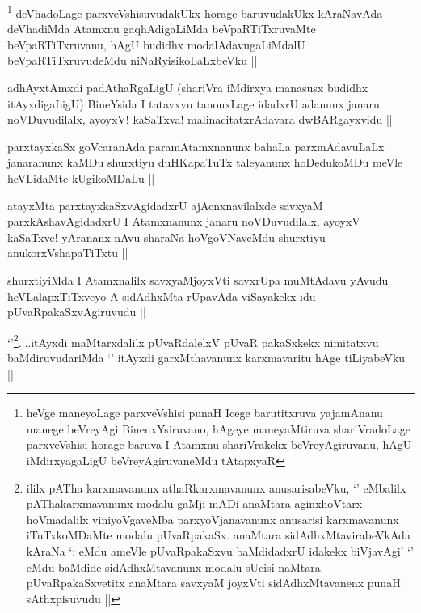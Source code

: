 
\begin{artha}
\footnote[1]{heVge maneyoLage parxveVshisi punaH Icege barutitxruva yajamAnanu manege beVreyAgi BinenxYsiruvano, hAgeye maneyaMtiruva shariVradoLage parxveVshisi horage baruva I Atamxnu shariVrakekx beVreyAgiruvanu, hAgU iMdirxyagaLigU beVreyAgiruvaneMdu tAtapxyaR}
deVhadoLage parxveVshisuvudakUkx horage baruvudakUkx  kAraNavAda deVhadiMda Atamxnu gaqhAdigaLiMda beVpaRTiTxruvaMte beVpaRTiTxruvanu, hAgU budidhx modalAdavugaLiMdalU beVpaRTiTxruvudeMdu niNaRyisikoLaLxbeVku ||
\end{artha}


\begin{artha}
adhAyxtAmxdi padAthaRgaLigU (shariVra iMdirxya manasusx budidhx itAyxdigaLigU) BineYsida I tatavxvu tanonxLage idadxrU adanunx janaru noVDuvudilalx, ayoyxV! kaSaTxva! malinacitatxrAdavara dwBARgayxvidu ||
\end{artha}

\begin{artha}
parxtayxkaSx goVcaranAda paramAtamxnanunx bahaLa parxmAdavuLaLx janaranunx kaMDu shurxtiyu duHKapaTuTx taleyanunx hoDedukoMDu meVle heVLidaMte kUgikoMDaLu ||
\end{artha}


\begin{artha}
atayxMta parxtayxkaSxvAgidadxrU ajAcnxnavilalxde savxyaM parxkAshavAgidadxrU I Atamxnanunx janaru noVDuvudilalx, ayoyxV kaSaTxve! yArananx nAvu sharaNa hoVgoVNaveMdu shurxtiyu anukorxVshapaTiTxtu ||
\end{artha}


\begin{artha}
shurxtiyiMda I Atamxnalilx savxyaMjoyxVti savxrUpa muMtAdavu yAvudu heVLalapxTiTxveyo A sidAdhxMta rUpavAda viSayakekx idu pUvaRpakaSxvAgiruvudu ||
\end{artha}


\begin{artha}
`\stext'\footnote[1]{ililx pATha karxmavanunx athaRkarxmavanunx anusarisabeVku, `\stext' eMbalilx pAThakarxmavanunx modalu gaMji mADi anaMtara aginxhoVtarx hoVmadalilx  viniyoVgaveMba parxyoVjanavanunx anusarisi karxmavanunx iTuTxkoMDaMte modalu pUvaRpakaSx. anaMtara sidAdhxMtavirabeVkAda kAraNa `\stext: eMdu ameVle pUvaRpakaSxvu baMdidadxrU idakekx biVjavAgi'  `\stext' eMdu baMdide sidAdhxMtavanunx modalu sUcisi naMtara pUvaRpakaSxvetitx anaMtara savxyaM joyxVti sidAdhxMtavanenx punaH sAthxpisuvudu ||}....itAyxdi maMtarxdalilx pUvaRdalelxV pUvaR pakaSxkekx nimitatxvu baMdiruvudariMda `\stext' itAyxdi garxMthavanunx karxmavaritu hAge tiLiyabeVku ||
\end{artha}

